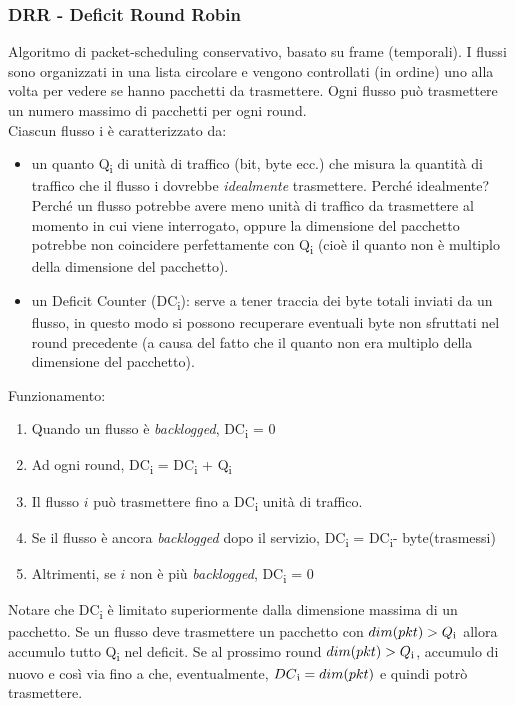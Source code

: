 \documentclass{article}
\begin{document}
\subsubsection{DRR - Deficit Round Robin}
Algoritmo di packet-scheduling conservativo, basato su frame (temporali). I flussi sono organizzati in una lista circolare e vengono controllati (in ordine) uno alla volta per vedere se hanno pacchetti da trasmettere. Ogni flusso può trasmettere un numero massimo di pacchetti per ogni round.\\
Ciascun flusso i è caratterizzato da:
\begin{itemize}
    \item un quanto Q\textsubscript{i} di unità di traffico (bit, byte ecc.) che misura la quantità di traffico che il flusso i dovrebbe \textit{idealmente} trasmettere. Perché idealmente? Perché un flusso potrebbe avere meno unità di traffico da trasmettere al momento in cui viene interrogato, oppure la dimensione del pacchetto potrebbe non coincidere perfettamente con Q\textsubscript{i} (cioè il quanto non è multiplo della dimensione del pacchetto).
    \item un Deficit Counter (DC\textsubscript{i}): serve a tener traccia dei byte totali inviati da un flusso, in questo modo si possono recuperare eventuali byte non sfruttati nel round precedente (a causa del fatto che il quanto non era multiplo della dimensione del pacchetto).
\end{itemize}
Funzionamento:
\begin{enumerate}
    \item Quando un flusso è \textit{backlogged}, DC\textsubscript{i} = 0
    \item Ad ogni round, DC\textsubscript{i} = DC\textsubscript{i} + Q\textsubscript{i}
    \item Il flusso \(i\) può trasmettere fino a DC\textsubscript{i} unità di traffico.
    \item Se il flusso è ancora \textit{backlogged} dopo il servizio, DC\textsubscript{i} = DC\textsubscript{i}- byte(trasmessi)
    \item Altrimenti, se \(i\) non è più \textit{backlogged}, DC\textsubscript{i} = 0
\end{enumerate}
Notare che DC\textsubscript{i} è limitato superiormente dalla dimensione massima di un pacchetto. Se un flusso deve trasmettere un pacchetto con \( dim(pkt) > Q\textsubscript{i} \) allora accumulo tutto Q\textsubscript{i} nel deficit. Se al prossimo round \( dim(pkt) > Q\textsubscript{i} \), accumulo di nuovo e così via fino a che, eventualmente, \( DC\textsubscript{i} = dim(pkt) \) e quindi potrò trasmettere.\\
\newpage
\end{document}

